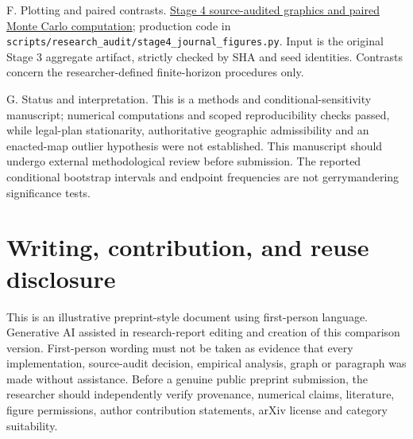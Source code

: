 \documentclass[
  10pt,
]{article}
\begin{document}
F. Plotting and paired contrasts.
\href{https://github.com/DjokovicMan22/Gerrymandering-Project/actions/runs/39203488689}{Stage
4 source-audited graphics and paired Monte Carlo computation};
production code in
\texttt{scripts/research\_audit/stage4\_journal\_figures.py}. Input is
the original Stage 3 aggregate artifact, strictly checked by SHA and
seed identities. Contrasts concern the researcher-defined finite-horizon
procedures only.

G. Status and interpretation. This is a methods and
conditional-sensitivity manuscript; numerical computations and scoped
reproducibility checks passed, while legal-plan stationarity,
authoritative geographic admissibility and an enacted-map outlier
hypothesis were not established. This manuscript should undergo external
methodological review before submission. The reported conditional
bootstrap intervals and endpoint frequencies are not gerrymandering
significance tests.


\section*{Writing, contribution, and reuse disclosure}
This is an illustrative preprint-style document using first-person language. Generative AI assisted in research-report editing and creation of this comparison version. First-person wording must not be taken as evidence that every implementation, source-audit decision, empirical analysis, graph or paragraph was made without assistance. Before a genuine public preprint submission, the researcher should independently verify provenance, numerical claims, literature, figure permissions, author contribution statements, arXiv license and category suitability.
\end{document}
